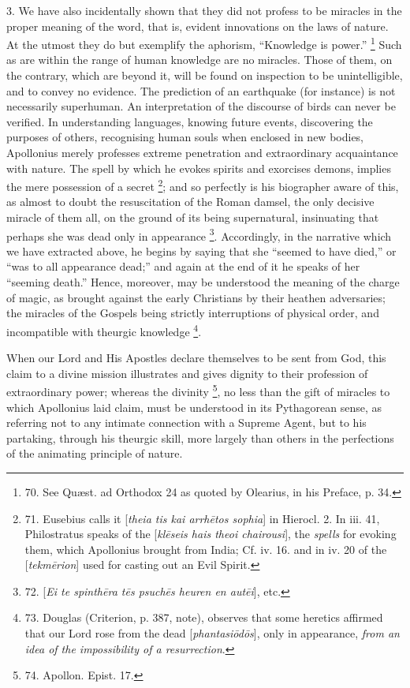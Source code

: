3. We have also incidentally
shown that they did not profess to be miracles in the proper meaning
of the word, that is, evident innovations on the laws of nature. At
the utmost they do but exemplify the aphorism, ``Knowledge is power.'' \footnote{70.
See Quæst. ad Orthodox 24 as quoted by Olearius, in his Preface, p.
34.} Such as are within the range of human knowledge are no
miracles. Those of them, on the contrary, which are beyond it, will be
found on inspection to be unintelligible, and to convey no evidence.
The prediction of an earthquake (for instance) is not necessarily
superhuman. An interpretation of the discourse of birds can never be
verified. In understanding languages, knowing future events,
discovering the purposes of others, recognising human souls when
enclosed in new bodies, Apollonius merely professes extreme
penetration and extraordinary acquaintance with nature. The spell by
which he evokes spirits and exorcises demons, implies the mere
possession of a secret \footnote{71.
Eusebius calls it [\emph{theia tis kai arrh\={e}tos sophia}] in
Hierocl. 2. In iii. 41, Philostratus speaks of the [\emph{kl\={e}seis
hais theoi chairousi}], the \emph{spells} for evoking them, which
Apollonius brought from India; Cf. iv. 16. and in iv. 20 of the [\emph{tekm\={e}rion}]
used for casting out an Evil Spirit.};
and so perfectly is his biographer aware of this, as almost to doubt
the resuscitation of the Roman damsel, the only decisive miracle of
them all, on the ground of its being supernatural, insinuating that
perhaps she was dead only in appearance \footnote{72.
[\emph{Ei te spinth\={e}ra t\={e}s psuch\={e}s heuren en aut\={e}i}],
etc.}. Accordingly, in the narrative which
we have extracted above, he begins by saying that she ``seemed to have
died,'' or ``was to all appearance dead;'' and again at the end of it he
speaks of her ``seeming death.'' Hence, moreover, may be understood the
meaning of the charge of magic, as brought against the early
Christians by their heathen adversaries; the miracles of the Gospels
being strictly interruptions of physical order, and incompatible with
theurgic knowledge \footnote{73.
Douglas (Criterion, p. 387, note), observes that some heretics
affirmed that our Lord rose from the dead [\emph{phantasi\={o}d\={o}s}],
only in appearance, \emph{from an idea of the impossibility of a
resurrection}.}.

When our Lord and His Apostles
declare themselves to be sent from God, this claim to a divine mission
illustrates and gives dignity to their profession of extraordinary
power; whereas the divinity \footnote{74.
Apollon. Epist. 17.},
no less than the gift of miracles to which Apollonius laid claim, must
be understood in its Pythagorean sense, as referring not to any
intimate connection with a Supreme Agent, but to his partaking,
through his theurgic skill, more largely than others in the
perfections of the animating principle of nature.

